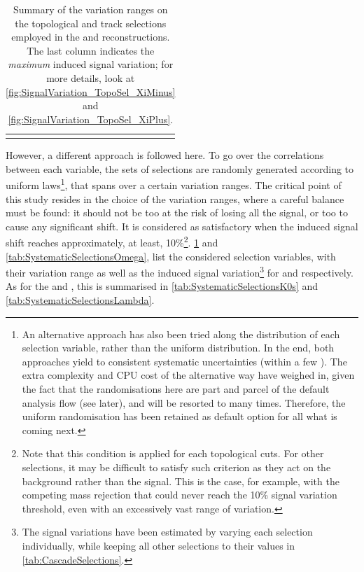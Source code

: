 \begin{table}[t]
\begin{tabular}{c|c|c}
    \noalign{\smallskip}\hline \noalign{\smallskip}
    \end{tabular}
    \caption{Summary of the variation ranges on the topological and track selections employed in the \rmXiM and \rmAxiP reconstructions. The last column indicates the \textit{maximum} induced signal variation; for more details, look at \fig\ref{fig:SignalVariation_TopoSel_XiMinus} and \fig\ref{fig:SignalVariation_TopoSel_XiPlus}.}\label{tab:SystematicSelectionsXi}
\end{table}

However, a different approach is followed here. To go over the correlations between each variable, the sets of selections are randomly generated according to uniform laws\footnote{An alternative approach has also been tried along the  distribution of each selection variable, rather than the uniform distribution. In the end, both approaches yield to consistent systematic uncertainties (within a few \kmass). The extra complexity and CPU cost of the alternative way have weighed in, given the fact that the randomisations here are part and parcel of the default analysis flow (see later), and will be resorted to many times. Therefore, the uniform randomisation has been retained as default option for all what is coming next.}, that spans over a certain variation ranges. The critical point of this study resides in the choice of the variation ranges, where a careful balance must be found: it should not be too  at the risk of losing all the signal, or too  to cause any significant shift. It is considered as satisfactory when the induced signal shift reaches approximately, at least, 10\%\footnote{Note that this condition is applied for each topological cuts. For other selections, it may be difficult to satisfy such criterion as they act on the background rather than the signal. This is the case, for example, with the competing mass rejection that could never reach the 10\% signal variation threshold, even with an excessively vast range of variation.}. \Tabs\ref{tab:SystematicSelectionsXi} and \ref{tab:SystematicSelectionsOmega}, list the considered selection variables, with their variation range as well as the induced signal variation\footnote{The signal variations have been estimated by varying each selection individually, while keeping all other selections to their values in \tab\ref{tab:CascadeSelections}.} for \rmXi and \rmOmega respectively. As for the \rmKzeroS and \rmLambda, this is summarised in \tabs\ref{tab:SystematicSelectionsK0s} and \ref{tab:SystematicSelectionsLambda}. \\

